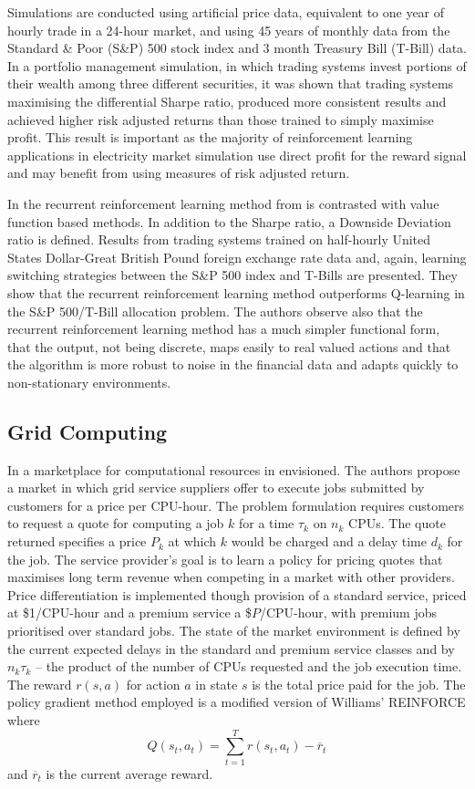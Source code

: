 Simulations are conducted using artificial price data, equivalent to one year
of hourly trade in a 24-hour market, and using 45 years of monthly data from
the Standard \& Poor (S\&P) 500 stock index and 3 month Treasury Bill (T-Bill)
data. In a portfolio management simulation, in which trading systems invest
portions of their wealth among three different securities, it was shown
that trading systems maximising the differential Sharpe ratio, produced more
consistent results and achieved higher risk adjusted returns than those
trained to simply maximise profit.  This result is important as the majority
of reinforcement learning applications in electricity market simulation use
direct profit for the reward signal and may benefit from using measures of risk
adjusted return.

In  the recurrent reinforcement learning method from
 is contrasted with value function based methods.  In addition
to the Sharpe ratio, a Downside Deviation ratio is defined.  Results from trading
systems trained on half-hourly United States Dollar-Great British Pound foreign
exchange rate data and, again, learning switching strategies between the S\&P
500 index and T-Bills are presented.  They show that the recurrent
reinforcement learning method outperforms Q-learning in the S\&P
500/T-Bill allocation problem.  The authors observe also that the recurrent
reinforcement learning method has a much simpler functional form, that the
output, not being discrete, maps easily to real valued actions and that the
algorithm is more robust to noise in the financial data and adapts quickly to
non-stationary environments.

\subsection{Grid Computing}
In  a marketplace for computational resources in
envisioned.  The authors propose a market in which grid service suppliers offer
to execute jobs submitted by customers for a price per CPU-hour.  The problem
formulation requires customers to request a quote for computing a job $k$ for a
time $\tau_k$ on $n_k$ CPUs.  The quote returned specifies a price $P_k$ at
which $k$ would be charged and a delay time $d_k$ for the job.  The service
provider's goal is to learn a policy for pricing quotes that maximises long
term revenue when competing in a market with other providers.  Price
differentiation is implemented though provision of a standard service, priced
at \$1/CPU-hour and a premium service a \$$P$/CPU-hour, with premium jobs
prioritised over standard jobs.  The state of the market environment is
defined by the current expected delays in the standard and premium service
classes and by $n_k \tau_k$ -- the product of the number of CPUs requested and
the job execution time.  The reward $r(s,a)$ for action $a$ in state $s$ is the
total price paid for the job.  The policy gradient method employed is a
modified version of Williams' REINFORCE where
\begin{equation}
Q(s_t,a_t) = \sum_{t=1}^T r(s_t,a_t) - \overline{r}_t
\end{equation}
and $\overline{r}_t$ is the current average reward.

